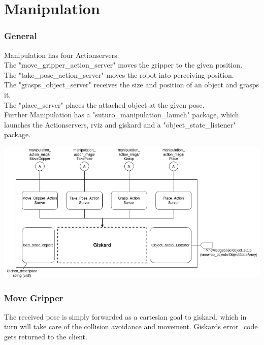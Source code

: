 \documentclass[main.tex]{subfiles}
\begin{document}
	
	\chapter{Manipulation}
	
	\subsection{General}
	Manipulation has four Actionservers.\\
	The "move\_gripper\_action\_server" moves the gripper to the given position.\\
	The "take\_pose\_action\_server" moves the robot into perceiving position.\\
	The "grasps\_object\_server" receives the size and position of an object and grasps it.\\
	The "place\_server" places the attached object at the given pose.\\
	Further Manipulation has a "suturo\_manipulation\_launch" package, which launches the Actionservers, rviz and giskard and a "object\_state\_listener" package.
	
	\includegraphics[scale=0.5]{pictures/Manipulation.png}
	
	\subsection{Move Gripper}
	The received pose is simply forwarded as a cartesian goal to giskard, which in turn will take care of the collision avoidance and movement. Giskards error\_code gets returned to the client.
	\vspace{1cm}
	
\end{document}
